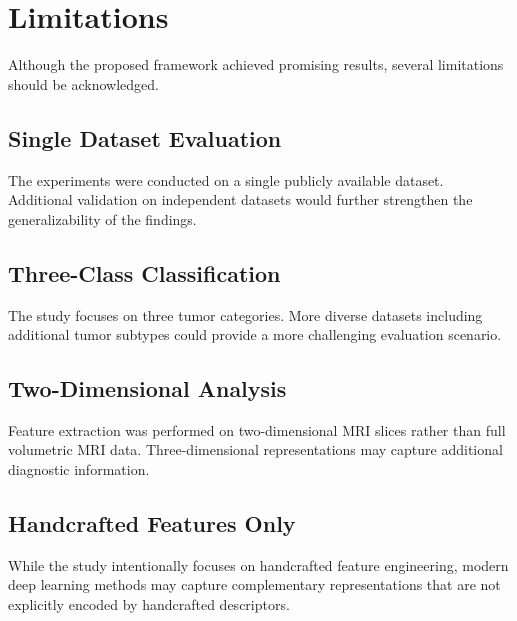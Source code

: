 \section{Limitations}
\label{sec:limitations}

Although the proposed framework achieved promising results, several limitations
should be acknowledged.

\subsection{Single Dataset Evaluation}
The experiments were conducted on a single publicly available dataset. Additional
validation on independent datasets would further strengthen the generalizability
of the findings.

\subsection{Three-Class Classification}
The study focuses on three tumor categories. More diverse datasets including
additional tumor subtypes could provide a more challenging evaluation scenario.

\subsection{Two-Dimensional Analysis}
Feature extraction was performed on two-dimensional MRI slices rather than full
volumetric MRI data. Three-dimensional representations may capture additional
diagnostic information.

\subsection{Handcrafted Features Only}
While the study intentionally focuses on handcrafted feature engineering, modern
deep learning methods may capture complementary representations that are not
explicitly encoded by handcrafted descriptors.
